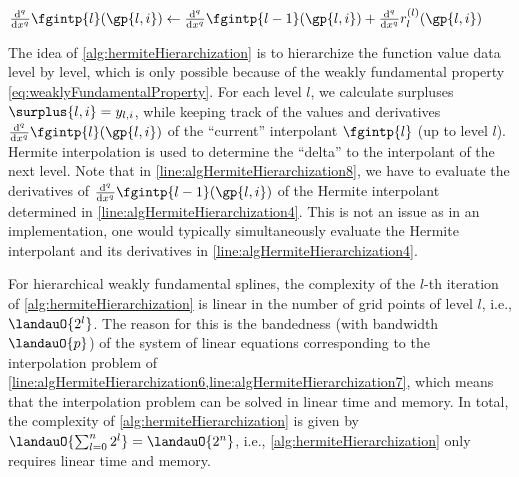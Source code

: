 \begin{algorithm}
\begin{algorithmic}[1]
{              %
              $\frac{\diff^q}{\dx^q} \fgintp{l}(\gp{l,i})
              \gets \frac{\diff^q}{\dx^q} \fgintp{l-1}(\gp{l,i}) +
              \frac{\diff^q}{\dx^q} r^{(l)}_l(\gp{l,i})$%
            }
            \label{line:algHermiteHierarchization8}
          \EndFor{}
        \EndFor{}
      \EndFor{}
    \EndFunction{}
  \end{algorithmic}
  \caption[%
    Hermite hierarchization%
  ]{%
    Hermite hierarchization on one-dimensional regular grids.
    Inputs are
    the vector $\vlinin = (\linin{l,i})_{(l,i) \in \liset}$
    of input data (function values $\fcnval{l,i}$ at the grid points) and
    the level $n$ of the regular grid,
    where $\liset = \{(l, i) \mid l = 0, \dotsc, n,\; i \in \hiset{l}\}$.
    The output is the vector
    $\vlinout = (\linout{l,i})_{(l,i) \in \liset}$
    of output data (hierarchical surpluses $\surplus{l,i}$).%
  }%
  \label{alg:hermiteHierarchization}%
\end{algorithm}

The idea of \cref{alg:hermiteHierarchization} is to
hierarchize the function value data level by level,
which is only possible because of the weakly fundamental property
\eqref{eq:weaklyFundamentalProperty}.
For each level $l$, we calculate surpluses
$\surplus{l,i} = \linout{l,i}$, while keeping track of
the values and derivatives
$\frac{\diff^q}{\dx^q} \fgintp{l}(\gp{l,i})$ of the
``current'' interpolant $\fgintp{l}$ (up to level $l$).
Hermite interpolation is used to determine the ``delta''
to the interpolant of the next level.
Note that in \cref{line:algHermiteHierarchization8},
we have to evaluate the derivatives of
$\frac{\diff^q}{\dx^q} \fgintp{l-1}(\gp{l,i})$ of the Hermite interpolant
determined in \cref{line:algHermiteHierarchization4}.
This is not an issue as in an implementation,
one would typically simultaneously evaluate the
Hermite interpolant and its derivatives in
\cref{line:algHermiteHierarchization4}.

For hierarchical weakly fundamental splines,
the complexity of the $l$-th iteration of \cref{alg:hermiteHierarchization}
is linear in the number of grid points of level $l$, i.e., $\landauO{2^l}$.
The reason for this is the bandedness (with bandwidth $\landauO{p}$) of the
system of linear equations corresponding to the interpolation problem of
\cref{line:algHermiteHierarchization6,line:algHermiteHierarchization7},
which means that the interpolation problem can be solved in
linear time and memory.
In total, the complexity of \cref{alg:hermiteHierarchization} is
given by $\landauO{\sum_{l=0}^n 2^l} = \landauO{2^n}$, i.e.,
\cref{alg:hermiteHierarchization} only requires linear time and memory.

